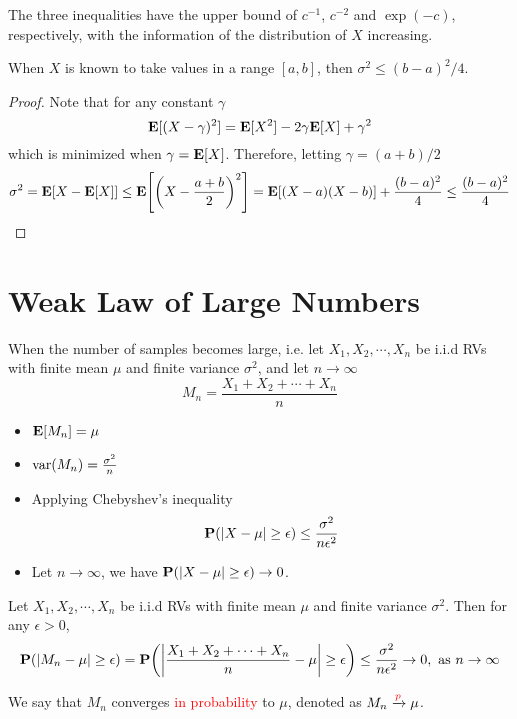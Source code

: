 \documentclass[device=normal, lang=en]{elegantbook}
\numberwithin{equation}{section}
\begin{document}
The three inequalities have the upper bound of $c^{-1}$, $c^{-2}$ and $\exp(-c)$, respectively, with the information of the distribution of $X$ increasing. 

\begin{example}
    When $X$ is known to take values in a range $[a, b]$, then $\sigma^2 \leq (b - a)^2/4$.
\end{example}
\begin{proof}
    Note that for any constant $\gamma$
    \begin{equation}
        \mathbf{E}[(X - \gamma)^2] = \mathbf{E}[X^2] - 2\gamma \mathbf{E}[X] + \gamma^2
    \end{equation}
    which is minimized when $\gamma = \mathbf{E}[X]$. Therefore, letting $\gamma = (a+b)/2$
    \begin{equation}
        \sigma^2 = \mathbf{E}[X - \mathbf{E}[X]] \leq \mathbf{E}\qty[\qty(X - \frac{a+b}{2})^2] = \mathbf{E}\qty[(X - a)(X - b)] + \frac{(b - a)^2}{4} \leq \frac{(b - a)^2}{4}
    \end{equation}
\end{proof}


\section{Weak Law of Large Numbers}
When the number of samples becomes large, i.e. let $X_1, X_2, \cdots, X_n$ be i.i.d RVs with finite mean $\mu$ and finite variance $\sigma^2$, and let $n \to \infty$
\begin{equation}
    M_n = \frac{X_1 + X_2 + \cdots + X_n}{n}
\end{equation}
\begin{itemize}
    \item $\mathbf{E}[M_n] = \mu$
    \item $\mathrm{var}(M_n) = \frac{\sigma^2}{n}$
    \item Applying Chebyshev's inequality
    \begin{equation}
        \mathbf{P}(\abs{X - \mu} \geq \epsilon) \leq \frac{\sigma^2}{n\epsilon^2}
    \end{equation}
    \item Let $n \to \infty$, we have $\mathbf{P}(\abs{X - \mu} \geq \epsilon) \to 0$.
\end{itemize}
\begin{theorem}
    Let $X_1, X_2, \cdots, X_n$ be i.i.d RVs with finite mean $\mu$ and finite variance $\sigma^2$. Then for any $\epsilon > 0$,
    \begin{equation}
        \mathbf{P}(\abs{M_n - \mu} \geq \epsilon) = \mathbf{P}\qty(\abs{\frac{X_1 + X_2 + \cdots + X_n}{n} - \mu} \geq \epsilon) \leq \frac{\sigma^2}{n\epsilon^2} \to 0, \text{ as } n \to \infty
    \end{equation}
\end{theorem}
We say that $M_n$ converges \textcolor{red}{in probability} to $\mu$, denoted as $M_n \xrightarrow{\textcolor{red}{p}} \mu$.
\end{document}
